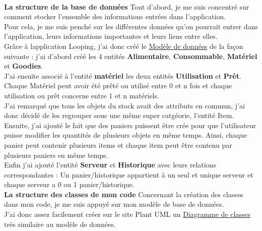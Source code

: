 \documentclass[11pt, twoside]{article}
\begin{document}
\vspace*{0.3cm}\\
{\large\textbf{La structure de la base de données}}
Tout d'abord, je me suis concentré sur comment stocker l'ensemble des informations entrées dans l'application.\\
Pour cela, je me suis penché sur les différentes données qu'on pourrait entrer dans l'application, leurs informations importantes et leurs liens entre elles.
\vspace*{0.2cm}\\
Grâce à lapplication Looping\cite{Looping}, j'ai donc créé le \hyperref[fig:modele]{Modèle de données} de la façon suivante :
j'ai d'abord créé les 4 entités \textbf{Alimentaire}, \textbf{Consommable}, \textbf{Matériel} et \textbf{Goodies}.\\
J'ai ensuite associé à l'entité \textbf{matériel} les deux entités \textbf{Utilisation} et \textbf{Prêt}. 
Chaque Matériel peut avoir été prêté ou utilisé entre 0 et n fois et chaque utilisation ou prêt concerne entre 1 et n matériels.
\vspace*{0.2cm}\\
J'ai remarqué que tous les objets du stock avait des attributs en commun, j'ai donc décidé de les regrouper sous une même super catgéorie, l'entité Item.
\vspace*{0.2cm}\\
Ensuite, j'ai ajouté le fait que des paniers puissent être crée pour que l'utilisateur puisse modifier les quantités de plusieurs objets en même temps.
Ainsi, chaque panier peut contenir plusieurs items et chaque item peut être contenu par plusieurs paniers en même temps.
\vspace*{0.2cm}\\
Enfin j'ai ajouté l'entité \textbf{Serveur} et \textbf{Historique} avec leurs relations correspondantes :
Un panier/historique appartient à un seul et unique serveur et chaque serveur a 0 ou 1 panier/historique. 
\vspace*{0.3cm}\\
{\large\textbf{La structure des classes de mon code }} Concernant la création des classes dans mon code, je me suis appuyé sur mon modèle de base de données.\\
J'ai donc assez facilement créer sur le site Plant UML\cite{Plant} un \hyperref[fig:modele]{Diagramme de classes} très similaire au modèle de données.
\newpage
{}\label{fig:modele}
\end{document}
